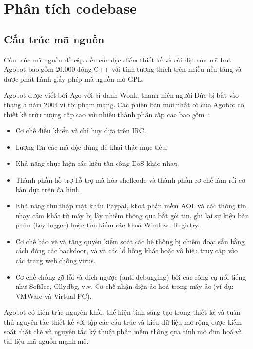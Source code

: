 
\chapter{Phân tích codebase}

\section{Cấu trúc mã nguồn}

Cấu trúc mã nguồn đề cập đến các đặc điểm thiết kế và cài đặt của mã bot.
Agobot bao gồm 20.000 dòng C++ với tính tương thích trên nhiều nền tảng và
được phát hành giấy phép mã nguồn mở GPL.

Agobot được viết bởi Ago với bí danh Wonk, thanh niên người Đức bị
bắt vào tháng 5 năm 2004 vì tội phạm mạng. Các phiên bản mới nhất có của Agobot
có thiết kế trừu tượng cấp cao với nhiều thành phần cấp cao bao gồm~\cite{inside,honeynet53}:

\begin{itemize}
\item Cơ chế điều khiển và chỉ huy dựa trên IRC.
\item Lượng lớn các mã độc dùng để khai thác mục tiêu.
\item Khả năng thực hiện các kiểu tấn công DoS khác nhau.
\item Thành phần hỗ trợ hỗ trợ mã hóa shellcode và thành phần cơ chế làm rối cơ bản dựa trên đa hình.
\item Khả năng thu thập mật khẩu Paypal, khoá phần mềm AOL và các thông tin.
	nhạy cảm khác từ máy bị lây nhiễm thông qua bắt gói tin, ghi lại sự kiện
	bàn phím (key logger) hoặc tìm kiếm các khoá Windows Registry.
\item Cơ chế bảo vệ và tăng quyền kiểm soát các hệ thống bị chiếm đoạt sẵn
	bằng cách đóng các backdoor, và vá các lổ hỗng khác hoặc vô hiệu
	truy cập vào các trang web chống virus.
\item Cơ chế chống gỡ lỗi và dịch ngược (anti-debugging) bởi
	các công cụ nổi tiếng như SoftIce, Ollydbg, v.v.
	Cơ chế nhận diện ảo hoá trong máy ảo (ví dụ: VMWare và Virtual PC).
\end{itemize}

Agobot có kiến trúc nguyên khối, thể hiện tính sáng tạo trong thiết kế và
tuân thủ nguyên tắc thiết kế với tập các cấu trúc và kiểu dữ liệu mở rộng
được kiểm soát chặt chẽ và nguyên tắc kỹ thuật phần mềm thông qua tính
mô đun hoá và tài liệu mã nguồn mạnh mẽ.

